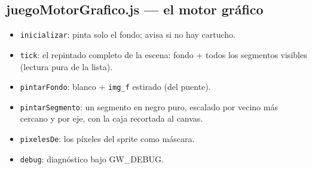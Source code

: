 \documentclass[../main.tex]{subfiles}
\begin{document}
	\subsection*{juegoMotorGrafico.js — el motor gráfico}
	
	\begin{itemize}
		\item \texttt{inicializar}: pinta solo el fondo; avisa si no hay
		cartucho.
		\item \texttt{tick}: el repintado completo de la escena: fondo + todos
		los segmentos visibles (lectura pura de la lista).
		\item \texttt{pintarFondo}: blanco + \texttt{img\_f} estirado (del
		puente).
		\item \texttt{pintarSegmento}: un segmento en negro puro, escalado
		por vecino más cercano y por eje, con la caja recortada al canvas.
		\item \texttt{pixelesDe}: los píxeles del sprite como máscara.
		\item \texttt{debug}: diagnóstico bajo GW\_DEBUG.
	\end{itemize}
	
	\clearpage
	
\end{document}
